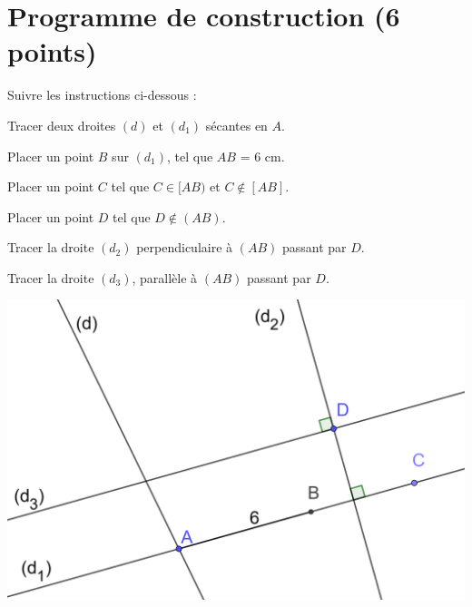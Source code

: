 \section{Programme de construction (6 points)}

Suivre les instructions ci-dessous :
\begin{questions}

		\question[1] Tracer deux droites $(d)$ et $(d_1)$ sécantes en $A$.
		
		\question[1] Placer un point $B$ sur $(d_1)$, tel que $AB$ = 6 cm.
		
		\question[1] Placer un point $C$ tel que $C \in [AB)$ et $C \notin [AB] $.
		
		\question[1] Placer un point $D$ tel que $D \notin (AB)$.
		
		\question[1] Tracer la droite $(d_2)$ perpendiculaire à $(AB)$ passant par $D$.
		
		\question[1] Tracer la droite $(d_3)$, parallèle à $(AB)$ passant par $D$.
		
		\begin{solution}
			\includegraphics[scale=0.25]{img/exo1_2}
		\end{solution}
	
\end{questions}

